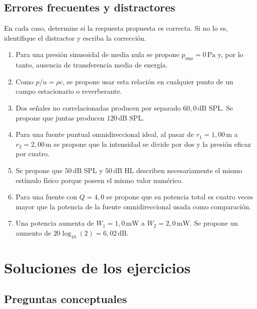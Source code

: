 \subsection*{Errores frecuentes y distractores}

En cada caso, determine si la respuesta propuesta es correcta. Si no lo es,
identifique el distractor y escriba la corrección.

\begin{enumerate}[label=\textbf{D\arabic*.},leftmargin=*]
    \item Para una presión sinusoidal de media nula se propone
    \(p_\mathrm{rms}=0\,\text{Pa}\) y, por lo tanto, ausencia de transferencia
    media de energía.

    \item Como \(p/u=\rho c\), se propone usar esta relación en cualquier
    punto de un campo estacionario o reverberante.

    \item Dos señales no correlacionadas producen por separado
    \(60{,}0\,\text{dB SPL}\). Se propone que juntas producen
    \(120\,\text{dB SPL}\).

    \item Para una fuente puntual omnidireccional ideal, al pasar de
    \(r_1=1{,}00\,\text{m}\) a \(r_2=2{,}00\,\text{m}\) se propone que la
    intensidad se divide por dos y la presión eficaz por cuatro.

    \item Se propone que \(50\,\text{dB SPL}\) y
    \(50\,\text{dB HL}\) describen necesariamente el mismo estímulo físico
    porque poseen el mismo valor numérico.

    \item Para una fuente con \(Q=4{,}0\) se propone que su potencia total es
    cuatro veces mayor que la potencia de la fuente omnidireccional usada como
    comparación.

    \item Una potencia aumenta de \(W_1=1{,}0\,\text{mW}\) a
    \(W_2=2{,}0\,\text{mW}\). Se propone un aumento de
    \(20\log_{10}(2)=6{,}02\,\text{dB}\).
\end{enumerate}

\section{Soluciones de los ejercicios}
\label{sec:u4-soluciones}

\subsection*{Preguntas conceptuales}

